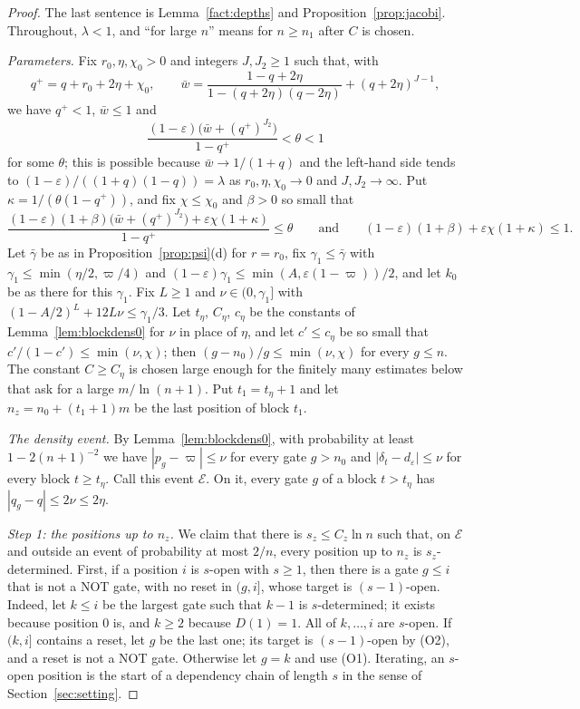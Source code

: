 \documentclass[11pt]{amsart}
\theoremstyle{definition}
\theoremstyle{remark}
\newcommand{\eps}{\varepsilon}
\begin{document}
\begin{proof}
The last sentence is Lemma~\ref{fact:depths} and Proposition~\ref{prop:jacobi}. Throughout,
$\lambda<1$, and ``for large $n$'' means for $n\ge n_1$ after $C$ is chosen.

\emph{Parameters.} Fix $r_0,\eta,\chi_0>0$ and integers $J,J_2\ge1$ such that, with
\[
q^+=q+r_0+2\eta+\chi_0,\qquad
\bar w=\frac{1-q+2\eta}{1-(q+2\eta)(q-2\eta)}+(q+2\eta)^{J-1},
\]
we have $q^+<1$, $\bar w\le1$ and
\begin{equation}\label{eq:theta2}
\frac{(1-\eps)\bigl(\bar w+(q^+)^{J_2}\bigr)}{1-q^+}<\theta<1
\end{equation}
for some $\theta$; this is possible because $\bar w\to1/(1+q)$ and the left-hand side tends to
$(1-\eps)/((1+q)(1-q))=\lambda$ as $r_0,\eta,\chi_0\to0$ and $J,J_2\to\infty$. Put
$\kappa=1/(\theta(1-q^+))$, and fix $\chi\le\chi_0$ and $\beta>0$ so small that
\begin{equation}\label{eq:theta3}
\frac{(1-\eps)(1+\beta)\bigl(\bar w+(q^+)^{J_2}\bigr)+\eps\chi(1+\kappa)}{1-q^+}\le\theta
\qquad\text{and}\qquad(1-\eps)(1+\beta)+\eps\chi(1+\kappa)\le1 .
\end{equation}
Let $\bar\gamma$ be as in Proposition~\ref{prop:psi}(d) for $r=r_0$, fix $\gamma_1\le\bar\gamma$
with $\gamma_1\le\min(\eta/2,\varpi/4)$ and $(1-\eps)\gamma_1\le\min(A,\eps(1-\varpi))/2$, and let
$k_0$ be as there for this $\gamma_1$. Fix $L\ge1$ and $\nu\in(0,\gamma_1]$ with
$(1-A/2)^L+12L\nu\le\gamma_1/3$. Let $t_\eta$, $C_\eta$,
$c_\eta$ be the constants of Lemma~\ref{lem:blockdens0} for $\nu$ in place of $\eta$, and let
$c'\le c_\eta$ be so small that $c'/(1-c')\le\min(\nu,\chi)$; then $(g-n_0)/g\le\min(\nu,\chi)$
for every $g\le n$. The constant $C\ge C_\eta$ is chosen large enough for the finitely many
estimates below that ask for a large $m/\ln(n+1)$. Put $t_1=t_\eta+1$ and let
$n_z=n_0+(t_1+1)m$ be the last position of block $t_1$.

\emph{The density event.} By Lemma~\ref{lem:blockdens0}, with probability at least
$1-2(n+1)^{-2}$ we have $|p_g-\varpi|\le\nu$ for every gate $g>n_0$ and
$|\delta_t-d_\eps|\le\nu$ for every block $t\ge t_\eta$. Call this event $\mathcal E$. On it, every
gate $g$ of a block $t>t_\eta$ has $|q_g-q|\le2\nu\le2\eta$.

\emph{Step 1: the positions up to $n_z$.} We claim that there is $s_z\le C_z\ln n$ such that, on
$\mathcal E$ and outside an event of probability at most $2/n$, every position up to $n_z$ is
$s_z$-determined. First, if a position $i$ is $s$-open with $s\ge1$, then there is a gate
$g\le i$ that is not a NOT gate, with no reset in $(g,i]$, whose target is $(s-1)$-open. Indeed,
let $k\le i$ be the largest gate such that $k-1$ is $s$-determined; it exists because position
$0$ is, and $k\ge2$ because $D(1)=1$. All of $k,\dots,i$ are $s$-open. If $(k,i]$ contains a
reset, let $g$ be the last one; its target is $(s-1)$-open by (O2), and a reset is not a NOT gate.
Otherwise let $g=k$ and use (O1). Iterating, an $s$-open position is the start of a dependency
chain of length $s$ in the sense of Section~\ref{sec:setting}.


\end{proof}
\end{document}
